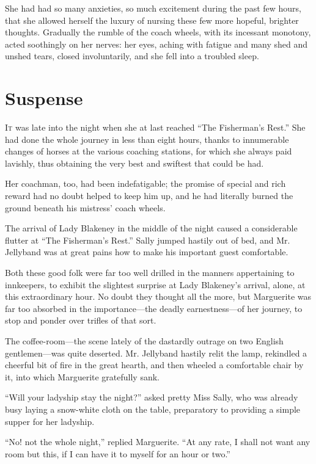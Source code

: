 \documentclass[paper=a5,BCOR=7mm,twoside,DIV=calc,12pt,usegeometry,chapterprefix,endperiod,headings=big]{scrbook}
\begin{document}
She had had so many anxieties, so much excitement during the past few hours, that she allowed herself the luxury of nursing these few more hopeful, brighter thoughts. Gradually the rumble of the coach wheels, with its incessant monotony, acted soothingly on her nerves: her eyes, aching with fatigue and many shed and unshed tears, closed involuntarily, and she fell into a troubled sleep.

\chapter{Suspense}
\lettrine[lines=4]{I}{t} was late into the night when she at last reached \enquote{The Fisherman's Rest.} She had done the whole journey in less than eight hours, thanks to innumerable changes of horses at the various coaching stations, for which she always paid lavishly, thus obtaining the very best and swiftest that could be had.

Her coachman, too, had been indefatigable; the promise of special and rich reward had no doubt helped to keep him up, and he had literally burned the ground beneath his mistress’ coach wheels.

The arrival of Lady Blakeney in the middle of the night caused a considerable flutter at \enquote{The Fisherman's Rest.} Sally jumped hastily out of bed, and Mr. Jellyband was at great pains how to make his important guest comfortable.

Both these good folk were far too well drilled in the manners appertaining to innkeepers, to exhibit the slightest surprise at Lady Blakeney's arrival, alone, at this extraordinary hour. No doubt they thought all the more, but Marguerite was far too absorbed in the importance---the deadly earnestness---of her journey, to stop and ponder over trifles of that sort.

The coffee-room---the scene lately of the dastardly outrage on two English gentlemen---was quite deserted. Mr. Jellyband hastily relit the lamp, rekindled a cheerful bit of fire in the great hearth, and then wheeled a comfortable chair by it, into which Marguerite gratefully sank.

\enquote{Will your ladyship stay the night?} asked pretty Miss Sally, who was already busy laying a snow-white cloth on the table, preparatory to providing a simple supper for her ladyship.

\enquote{No! not the whole night,} replied Marguerite. \enquote{At any rate, I shall not want any room but this, if I can have it to myself for an hour or two.}
\end{document}
